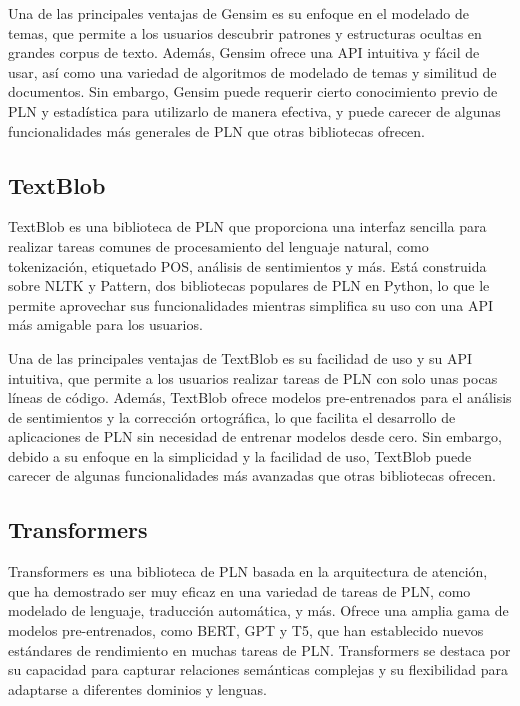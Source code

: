 Una de las principales ventajas de Gensim es su enfoque en el modelado de temas, que permite a los usuarios descubrir patrones y estructuras ocultas en grandes corpus de texto. Además, Gensim ofrece una API intuitiva y fácil de usar, así como una variedad de algoritmos de modelado de temas y similitud de documentos. Sin embargo, Gensim puede requerir cierto conocimiento previo de PLN y estadística para utilizarlo de manera efectiva, y puede carecer de algunas funcionalidades más generales de PLN que otras bibliotecas ofrecen.

\subsection{TextBlob}

TextBlob es una biblioteca de PLN que proporciona una interfaz sencilla para realizar tareas comunes de procesamiento del lenguaje natural, como tokenización, etiquetado POS, análisis de sentimientos y más. Está construida sobre NLTK y Pattern, dos bibliotecas populares de PLN en Python, lo que le permite aprovechar sus funcionalidades mientras simplifica su uso con una API más amigable para los usuarios.

Una de las principales ventajas de TextBlob es su facilidad de uso y su API intuitiva, que permite a los usuarios realizar tareas de PLN con solo unas pocas líneas de código. Además, TextBlob ofrece modelos pre-entrenados para el análisis de sentimientos y la corrección ortográfica, lo que facilita el desarrollo de aplicaciones de PLN sin necesidad de entrenar modelos desde cero. Sin embargo, debido a su enfoque en la simplicidad y la facilidad de uso, TextBlob puede carecer de algunas funcionalidades más avanzadas que otras bibliotecas ofrecen.

\subsection{Transformers}

Transformers es una biblioteca de PLN basada en la arquitectura de atención, que ha demostrado ser muy eficaz en una variedad de tareas de PLN, como modelado de lenguaje, traducción automática, y más. Ofrece una amplia gama de modelos pre-entrenados, como BERT, GPT y T5, que han establecido nuevos estándares de rendimiento en muchas tareas de PLN. Transformers se destaca por su capacidad para capturar relaciones semánticas complejas y su flexibilidad para adaptarse a diferentes dominios y lenguas.

